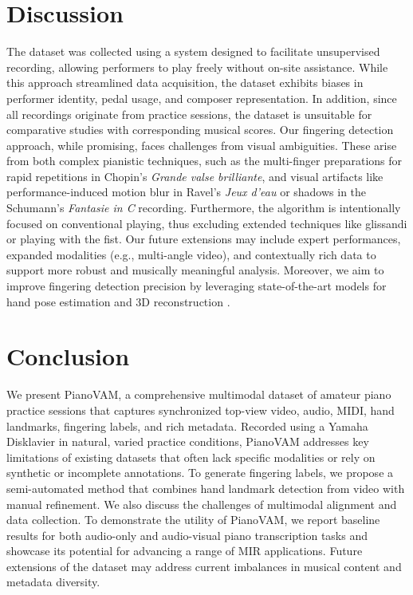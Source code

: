 \documentclass{article}
\begin{document}
\section{Discussion}\label{sec:discussion}
The dataset was collected using a system designed to facilitate unsupervised recording, allowing performers to play freely without on-site assistance. While this approach streamlined data acquisition, the dataset exhibits biases in performer identity, pedal usage, and composer representation. In addition, since all recordings originate from practice sessions, the dataset is unsuitable for comparative studies with corresponding musical scores. Our fingering detection approach, while promising, faces challenges from visual ambiguities. These arise from both complex pianistic techniques, such as the multi-finger preparations for rapid repetitions in Chopin's \textit{Grande valse brilliante}, and visual artifacts like performance-induced motion blur in Ravel's \textit{Jeux d'eau} or shadows in the Schumann's \textit{Fantasie in C} recording. Furthermore, the algorithm is intentionally focused on conventional playing, thus excluding extended techniques like glissandi or playing with the fist. Our future extensions may include expert performances, expanded modalities (e.g., multi-angle video), and contextually rich data to support more robust and musically meaningful analysis. Moreover, we aim to improve fingering detection precision by leveraging state-of-the-art models for hand pose estimation \cite{ViTPose++} and 3D reconstruction \cite{dong2024hamba}. %

\section{Conclusion}\label{sec:conclusion}
We present PianoVAM, a comprehensive multimodal dataset of amateur piano practice sessions that captures synchronized top-view video, audio, MIDI, hand landmarks, fingering labels, and rich metadata. Recorded using a Yamaha Disklavier in natural, varied practice conditions, PianoVAM addresses key limitations of existing datasets that often lack specific modalities or rely on synthetic or incomplete annotations. To generate fingering labels, we propose a semi-automated method that combines hand landmark detection from video with manual refinement. We also discuss the challenges of multimodal alignment and data collection. To demonstrate the utility of PianoVAM, we report baseline results for both audio-only and audio-visual piano transcription tasks and showcase its potential for advancing a range of MIR applications. Future extensions of the dataset may address current imbalances in musical content and metadata diversity.
\end{document}
